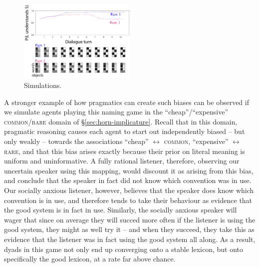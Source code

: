 \documentclass{article} %
\begin{document}
\begin{figure}
\centering
\includegraphics[width=0.5\textwidth]{figures/horn-composite.pdf}
\caption{\label{fig:horn} Simulations.}
\end{figure}

A stronger example of how pragmatics can create such biases can be observed if we simulate agents playing this naming game in the ``cheap''/``expensive'' \textsc{common}/\textsc{rare} domain of \S\ref{sec:horn-implicature}. Recall that in this domain, pragmatic reasoning causes each agent to start out independently biased -- but only weakly -- towards the associations ``cheap'' $\leftrightarrow$ \textsc{common}, ``expensive'' $\leftrightarrow$ \textsc{rare}, and that this bias arises exactly because their prior on literal meaning is uniform and uninformative. A fully rational listener, therefore, observing our uncertain speaker using this mapping, would discount it as arising from this bias, and conclude that the speaker in fact did not know which convention was in use. Our socially anxious listener, however, believes that the speaker does know which convention is in use, and therefore tends to take their behaviour as evidence that the good system is in fact in use. Similarly, the socially anxious speaker will wager that since on average they will succed more often if the listener is using the good system, they might as well try it -- and when they succeed, they take this as evidence that the listener was in fact using the good system all along. As a result, dyads in this game not only end up converging onto a stable lexicon, but onto specifically the good lexicon, at a rate far above chance.



%
\end{document}
